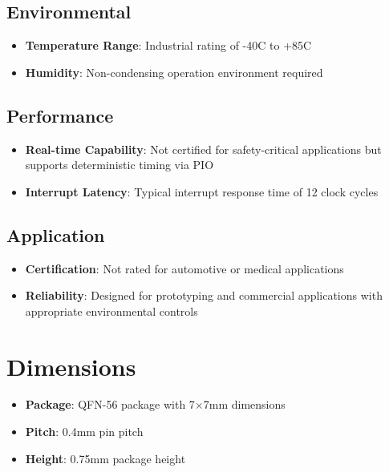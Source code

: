 \subsection{Environmental}
\begin{itemize}
    \item \textbf{Temperature Range}: Industrial rating of -40\textdegree C to +85\textdegree C \cite{RaspberryPiRP2040:2024}
    \item \textbf{Humidity}: Non-condensing operation environment required \cite{RaspberryPiRP2040:2024}
\end{itemize}

\subsection{Performance}
\begin{itemize}
    \item \textbf{Real-time Capability}: Not certified for safety-critical applications but supports deterministic timing via PIO \cite{RaspberryPiRP2040:2024}
    \item \textbf{Interrupt Latency}: Typical interrupt response time of 12 clock cycles \cite{RaspberryPiRP2040:2024}
\end{itemize}

\subsection{Application}
\begin{itemize}
    \item \textbf{Certification}: Not rated for automotive or medical applications \cite{RaspberryPiRP2040:2024}
    \item \textbf{Reliability}: Designed for prototyping and commercial applications with appropriate environmental controls \cite{RaspberryPiRP2040:2024}
\end{itemize}

\section{Dimensions}

\begin{itemize}
    \item \textbf{Package}: QFN-56 package with 7$\times$7mm dimensions \cite{RaspberryPiRP2040:2024}
    \item \textbf{Pitch}: 0.4mm pin pitch \cite{RaspberryPiRP2040:2024}
    \item \textbf{Height}: 0.75mm package height \cite{RaspberryPiRP2040:2024}
\end{itemize}

